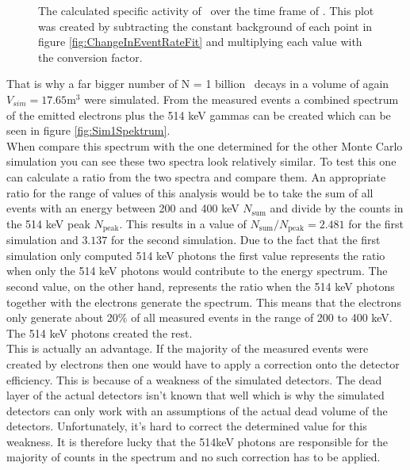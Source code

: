 \documentclass[encoding=utf8,british]{tumphthesis}
\begin{document}
\begin{figure}[t!]
\begin{minipage}[t]{.475\textwidth}
		\caption{
		The calculated specific activity of \Kr\ over the time frame of \PII.
		This plot was created by subtracting the constant background of each point in figure \ref{fig:ChangeInEventRateFit} and multiplying each value with the conversion factor.
		}
		\label{fig:activity}
	\end{minipage}
\end{figure}


That is why a far bigger number of N = 1 billion \Kr\ decays in a volume of again $V_{sim} = 17.65 \mathrm{m}^3$ were simulated.
From the measured events  a combined spectrum of the emitted electrons plus the 514 keV gammas can be created which can be seen in figure \ref{fig:Sim1Spektrum}.
\\

When compare this spectrum with the one determined for the other Monte Carlo simulation you can see these two spectra look relatively similar.
To test this one can calculate a ratio from the two spectra and compare them.
An appropriate ratio for the range of values of this analysis would be to take the sum of all events with an energy between 200 and 400 keV $N_{\mathrm{sum}}$ and divide by the counts in the 514 keV peak $N_ {\mathrm{peak}}$.
This results in a value of $N_{\mathrm{sum}}/N_{\mathrm{peak}} = 2.481$ for the first simulation and $3.137$ for the second simulation.
Due to the fact that the first simulation only computed 514 keV photons the first value represents the ratio when only the 514 keV photons would contribute to the energy spectrum.
The second value, on the other hand, represents the ratio when the 514 keV photons together with the electrons generate the spectrum.
This means that the electrons only generate about 20$\%$ of all measured events in the range of 200 to 400 keV.
The 514 keV photons created the rest.
\\

This is actually an advantage.
If the majority of the measured events were created by electrons then one would have to apply a correction onto the detector efficiency.
This is because of a weakness of the simulated detectors.
The dead layer of the actual detectors isn't known that well which is why the simulated detectors can only work with an assumptions of the actual dead volume of the detectors.
Unfortunately, it's hard to correct the determined value for this weakness.
It is therefore lucky that the 514keV photons are responsible for the majority of counts in the spectrum and no such correction has to be applied.
\\
\end{document}
